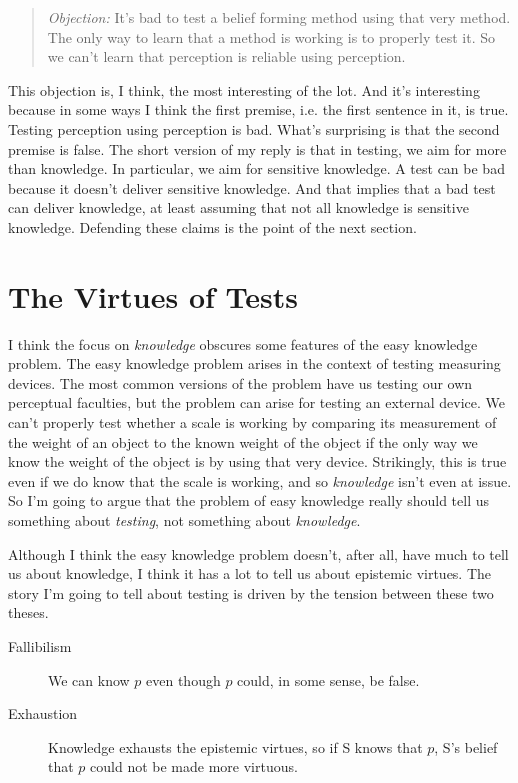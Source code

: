 \begin{quote}\textit{Objection:}
It's bad to test a belief forming method using that very method. The only way to learn that a method is working is to properly test it. So we can't learn that perception is reliable using perception.
\end{quote}

\noindent This objection is, I think, the most interesting of the lot. And it's interesting because in some ways I think the first premise, i.e. the first sentence in it, is true. Testing perception using perception is bad. What's surprising is that the second premise is false. The short version of my reply is that in testing, we aim for more than knowledge. In particular, we aim for sensitive knowledge. A test can be bad because it doesn't deliver sensitive knowledge. And that implies that a bad test can deliver knowledge, at least assuming that not all knowledge is sensitive knowledge. Defending these claims is the point of the next section.

\section{The Virtues of Tests}

I think the focus on \textit{knowledge} obscures some features of the easy knowledge problem. The easy knowledge problem arises in the context of testing measuring devices. The most common versions of the problem have us testing our own perceptual faculties, but the problem can arise for testing an external device. We can't properly test whether a scale is working by comparing its measurement of the weight of an object to the known weight of the object if the only way we know the weight of the object is by using that very device. Strikingly, this is true even if we do know that the scale is working, and so \textit{knowledge} isn't even at issue. So I'm going to argue that the problem of easy knowledge really should tell us something about \textit{testing}, not something about \textit{knowledge}. 

Although I think the easy knowledge problem doesn't, after all, have much to tell us about knowledge, I think it has a lot to tell us about epistemic virtues. The story I'm going to tell about testing is driven by the tension between these two theses.

\begin{description}
\item[Fallibilism] We can know $p$ even though $p$ could, in some sense, be false.
\item[Exhaustion] Knowledge exhausts the epistemic virtues, so if S knows that $p$, S's belief that $p$ could not be made more virtuous.
\end{description}


